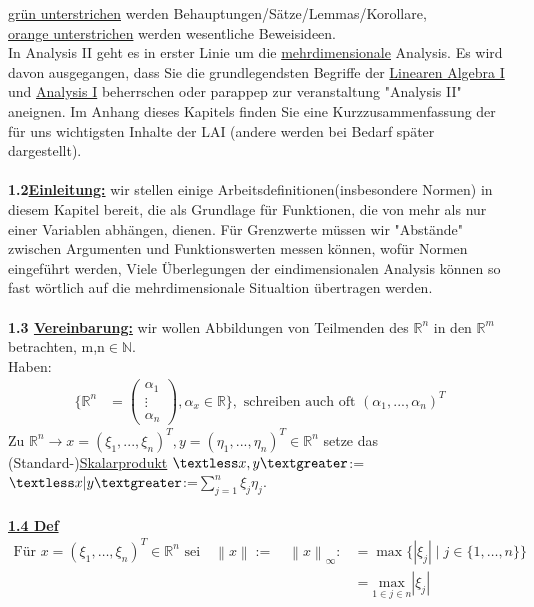 \documentclass[11pt]{article}
\begin{document}
	\ul{grün unterstrichen} werden 
	Behauptungen/Sätze/Lemmas/Korollare,\\
	\ul{orange unterstrichen} werden wesentliche Beweisideen.\\
	In Analysis II geht es in erster Linie um die  \underline{mehrdimensionale} Analysis.
	Es wird davon ausgegangen, dass Sie die grundlegendsten Begriffe der  \ul{Linearen Algebra I} und \ul{Analysis I} beherrschen oder parappep zur veranstaltung "Analysis II" aneignen.
	Im Anhang dieses Kapitels finden Sie eine Kurzzusammenfassung der für uns 
	wichtigsten Inhalte der LAI (andere werden bei Bedarf später dargestellt).\\
	\\
	\textbf{1.2\underline{Einleitung:}} wir stellen einige 
	Arbeitsdefinitionen(insbesondere Normen) in diesem Kapitel bereit, die als 
	Grundlage für Funktionen, die von mehr als nur einer Variablen abhängen, 
	dienen. Für Grenzwerte müssen wir "Abstände" zwischen Argumenten und 
	Funktionswerten messen können, wofür Normen eingeführt werden, Viele 
	Überlegungen der eindimensionalen Analysis können so fast wörtlich auf die 
	mehrdimensionale Situaltion übertragen werden.\\
	\\
	\textbf{1.3 \underline{Vereinbarung:}} wir wollen Abbildungen von 
	Teilmenden des $\mathbb{R}^n$ in den $\mathbb{R}^m$ betrachten, m,n$\in 
	\mathbb{N}$.\\
	Haben:\\
	\begin{align}
		\{\mathbb{R}^n &= \begin{pmatrix} 
			\alpha_{1} \\				 
			\vdots \\
			\alpha_{n}
		\end{pmatrix}, \alpha_x \in \mathbb{R}\},\text{ schreiben auch oft } 
		(\alpha_1,...,\alpha_n)^T
	\end{align}
	Zu $\mathbb{R}^n \rightarrow x =(\xi_1,...,\xi_n)^T, 
	y=(\eta_1,...,\eta_n)^T \in \mathbb{R}^n$ setze das\\
	(Standard-)\ul{Skalarprodukt} 
	\ul{$\textless x,y\textgreater$}:=$\textless 
	x|y\textgreater$:=$\sum_{j=1}^{n}\xi_j\eta_j$.\\
	\\
	\textbf{\underline{1.4 Def}}
	\begin{align}
		\text{Für } x = (\xi_1, \dots, \xi_n)^T \in \mathbb{R}^n \text{ sei} 
		\quad 
		\left\lVert x \right\rVert := \quad 
		\left\lVert x \right\rVert_{\infty} :&= \max \{ |\xi_j| \mid j \in \{1, 
		\dots, n\} \}\nonumber\\ 
		&= \underset{1\in j\in n}{\text{max}} |\xi_j|\nonumber
	\end{align}\\
\end{document}
